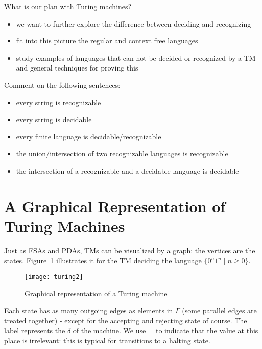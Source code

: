 What is our plan with Turing machines?

\begin{itemize}
\item we want to further explore the difference between deciding and
  recognizing
\item fit into this picture the regular and context free
  languages
\item study examples of languages that can not be decided or
  recognized by a TM and general techniques for proving this
\end{itemize}

\begin{exercise}
Comment on the following sentences:
\begin{itemize}
\item every string is recognizable
\item every string is decidable
\item every finite language is decidable/recognizable
\item the union/intersection of two recognizable languages is recognizable
\item the intersection of a recognizable and a decidable language is
  decidable
\end{itemize}
\end{exercise}



\section{A Graphical Representation of Turing Machines}

Just as FSAs and PDAs, TMs can be visualized by a graph: the vertices
are the states. Figure~\ref{turing2} illustrates it for the TM
deciding the language $\{0^n1^n\mid n \geq 0\}$.

\begin{figure}[h]
	\centering
\texttt{[image: turing2]}
\caption{Graphical representation of a Turing machine}
\label{turing2}
\end{figure}

Each state has as many outgoing edges as elements in $\Gamma$ (some
parallel edges are treated together) - except for the accepting and rejecting
state of course. The label represents the $\delta$ of the machine. We
use \_ to indicate that the value at this place is irrelevant: this is
typical for transitions to a halting state.



